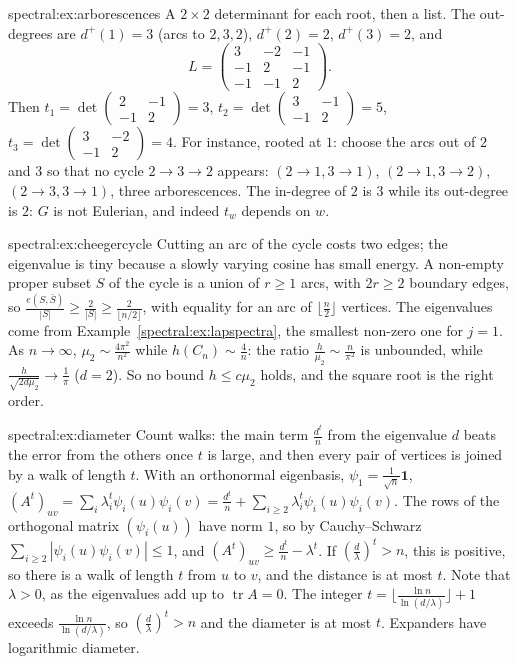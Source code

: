 \begin{solution}{spectral:ex:arborescences}
\idea A $2\times2$ determinant for each root, then a list.
\writeup The out-degrees are $d^+(1)=3$ (arcs to $2,3,2$), $d^+(2)=2$, $d^+(3)=2$, and
\[
L=\begin{pmatrix}3&-2&-1\\-1&2&-1\\-1&-1&2\end{pmatrix}.
\]
Then $t_1=\det\begin{pmatrix}2&-1\\-1&2\end{pmatrix}=3$, $t_2=\det\begin{pmatrix}3&-1\\-1&2\end{pmatrix}=5$, $t_3=\det\begin{pmatrix}3&-2\\-1&2\end{pmatrix}=4$. For instance, rooted at $1$: choose the arcs out of $2$ and $3$ so that no cycle $2\to3\to2$
appears: $(2\to1,3\to1)$, $(2\to1,3\to2)$, $(2\to3,3\to1)$, three arborescences. The in-degree of $2$ is $3$ while its out-degree is $2$: $G$ is not Eulerian, and indeed $t_w$ depends on $w$.
\end{solution}

\begin{solution}{spectral:ex:cheegercycle}
\idea Cutting an arc of the cycle costs two edges; the eigenvalue is tiny because a slowly varying cosine has small energy.
\writeup A non-empty proper subset $S$ of the cycle is a union of $r\ge1$ arcs, with $2r\ge2$ boundary edges, so $\frac{e(S,\bar S)}{|S|}\ge\frac2{|S|}\ge\frac2{\lfloor n/2\rfloor}$, with equality for an arc of $\lfloor\frac n2\rfloor$ vertices. The
eigenvalues come from Example~\ref{spectral:ex:lapspectra}, the smallest non-zero one for $j=1$. As $n\to\infty$, $\mu_2\sim\frac{4\pi^2}{n^2}$ while $h(C_n)\sim\frac4n$: the ratio $\frac h{\mu_2}\sim\frac n{\pi^2}$ is unbounded, while
$\frac h{\sqrt{2d\mu_2}}\to\frac1\pi$ ($d=2$). So no bound $h\le c\mu_2$ holds, and the square root is the right order.
\end{solution}

\begin{solution}{spectral:ex:diameter}
\idea Count walks: the main term $\frac{d^t}n$ from the eigenvalue $d$ beats the error from the others once $t$ is large, and then every pair of vertices is joined by a walk of length $t$.
\writeup With an orthonormal eigenbasis, $\psi_1=\frac1{\sqrt n}\mathbf1$, $(A^t)_{uv}=\sum_i\lambda_i^t\psi_i(u)\psi_i(v)=\frac{d^t}n+\sum_{i\ge2}\lambda_i^t\psi_i(u)\psi_i(v)$. The rows of the orthogonal matrix $(\psi_i(u))$ have norm $1$, so
by Cauchy--Schwarz $\sum_{i\ge2}|\psi_i(u)\psi_i(v)|\le1$, and $(A^t)_{uv}\ge\frac{d^t}n-\lambda^t$. If $(\frac d\lambda)^t>n$, this is positive, so there is a walk of length $t$ from $u$ to $v$, and the distance is
at most $t$. Note that $\lambda>0$, as the eigenvalues add up to $\operatorname{tr}A=0$. The integer $t=\lfloor\frac{\ln n}{\ln(d/\lambda)}\rfloor+1$ exceeds $\frac{\ln n}{\ln(d/\lambda)}$, so $(\frac d\lambda)^t>n$ and the diameter is at most $t$. Expanders have logarithmic diameter.
\end{solution}

